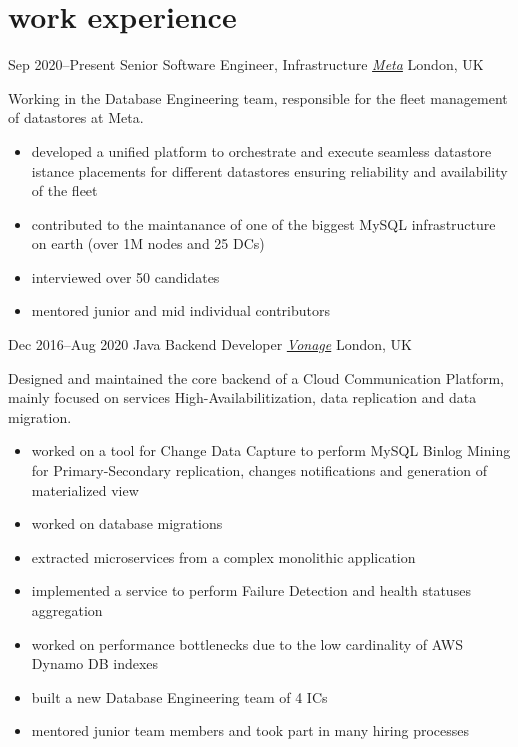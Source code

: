 \vspace{-.4cm}
\section{\normalfont work experience}

\begin{entrylist}
\entry
{Sep 2020--Present}
{Senior Software Engineer, Infrastructure {\normalfont \emph{\href{https://www.meta.com/}{Meta}}}}
{London, UK}
{Working in the Database Engineering team, responsible for the fleet management of datastores at Meta. 
\vspace{-.2cm}
\begin{itemize}[leftmargin=.6cm]
	\item developed a unified platform to orchestrate and execute seamless datastore istance placements for different datastores ensuring reliability and availability of the fleet
	\item contributed to the maintanance of one of the biggest MySQL infrastructure on earth (over 1M nodes and 25 DCs) 
	\item interviewed over 50 candidates  
	\item mentored junior and mid individual contributors
\end{itemize}
}


\entry
{Dec 2016--Aug 2020}
{Java Backend Developer {\normalfont \emph{\href{https://www.vonage.com/business/}{Vonage}}}}
{London, UK}
{Designed and maintained the core backend of a Cloud Communication Platform, mainly focused on services High-Availabilitization, data replication and data migration.
\vspace{-.2cm}
\begin{itemize}[leftmargin=.6cm]
	\item worked on a tool for Change Data Capture to perform MySQL Binlog Mining for Primary-Secondary replication, changes notifications and generation of materialized view 
	\item worked on database migrations
	\item extracted microservices from a complex monolithic application
	\item implemented a service to perform Failure Detection and health statuses aggregation
	\item worked on performance bottlenecks due to the low cardinality of AWS Dynamo DB indexes
	\item built a new Database Engineering team of 4 ICs 
	\item mentored junior team members and took part in many hiring processes
\end{itemize}
}


\end{entrylist}
